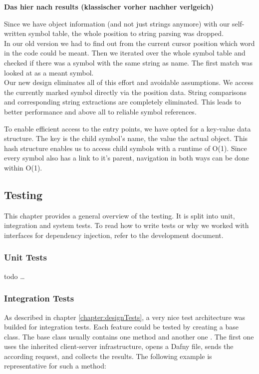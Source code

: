 \textbf{Das hier nach results (klassischer vorher nachher verlgeich)}

Since we have object information (and not just strings anymore) with our self-written symbol table,
the whole position to string parsing was dropped. \\

In our old version we had to find out from the current cursor position which word in the code could be meant.
Then we iterated over the whole symbol table and checked if there was a symbol with the same string as name.
The first match was looked at as a meant symbol. \\

Our new design eliminates all of this effort and avoidable assumptions.
We access the currently marked symbol directly via the position data.
String comparisons and corresponding string extractions are completely eliminated.
This leads to better performance and above all to reliable symbol references.

To enable efficient access to the entry points, we have opted for a key-value data structure. The key is the child symbol's name, the value the actual  object.
This hash structure enables us to access child symbols with a runtime of O(1). Since every symbol also has a link to it's parent, navigation in both ways can be done within O(1).



\subsection{Testing}

This chapter provides a general overview of the testing. It is split into unit, integration and system tests. To read how to write tests or why we worked with interfaces for dependency injection, refer to the development document.

\subsubsection{Unit Tests}
todo
\dots
{}


\subsubsection{Integration Tests}
As described in chapter \ref{chapter:designTests}, a very nice test architecture was builded for integration tests. Each feature could be tested by creating a base class. The base class usually contains one method  and another one . The first one uses the inherited client-server infrastructure, opens a Dafny file, sends the according request, and collects the results. The following example is representative for such a method:


